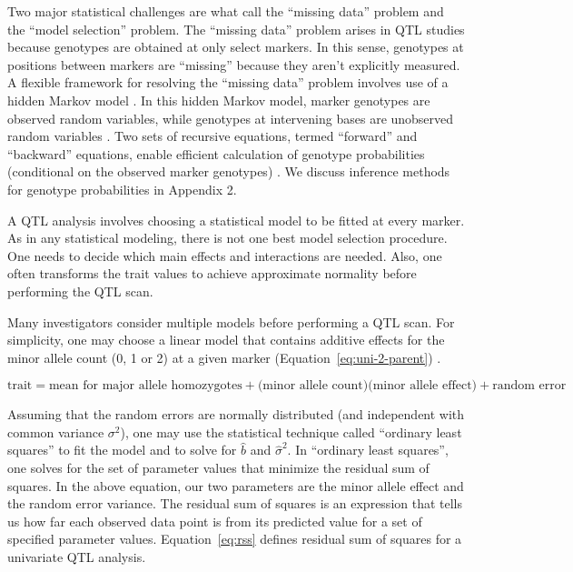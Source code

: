 \documentclass[oneside]{book}\usepackage[]{graphicx}\usepackage[]{color}
\begin{document}
Two major statistical challenges are what \citet{broman2009guide} call 
the ``missing data'' problem and the ``model selection'' problem. 
The ``missing data'' problem arises in QTL studies because genotypes are obtained
at only select markers. In this sense, genotypes at positions between
markers are ``missing'' because they aren't explicitly measured. 
A flexible framework for resolving the ``missing data'' problem involves use of a
hidden Markov model \citep{broman2009guide, broman2006use}. 
In this hidden Markov model, marker genotypes are observed random variables, 
while genotypes at intervening bases are unobserved random variables \citep{broman2009guide,broman2006use}. 
Two sets of recursive equations, termed ``forward'' and ``backward'' equations,
enable efficient calculation of genotype probabilities
(conditional on the observed marker genotypes) \citep{baum1970maximization}. We discuss inference methods for genotype probabilities in Appendix 2.




A QTL analysis involves choosing a statistical model to be fitted at every marker. 
As in any statistical modeling, there is not one best model selection procedure.
One needs to decide which main effects and interactions are needed.
Also, one often transforms the trait values to achieve approximate normality before performing the QTL scan. 

Many investigators consider multiple models before performing a QTL scan.
For simplicity, one may choose a linear model that contains additive effects for
the  minor allele count (0, 1 or 2) at a given marker (Equation~\ref{eq:uni-2-parent}) \citep{martinez1992estimating,haley1992simple}.

\begin{equation}
\text{trait} = \text{mean for major allele homozygotes} + \text{(minor allele count)}\text{(minor allele effect)} + \text{random error}
\label{eq:uni-2-parent}
\end{equation}

Assuming that the random errors are normally distributed (and independent with common
variance $\sigma^2$), one may use the statistical technique called ``ordinary least squares''
to fit the model and to solve for $\hat b$ and $\hat \sigma^2$.
In ``ordinary least squares'', one solves for the set of parameter values that
minimize the residual sum of squares. In the above equation, our two parameters are the minor allele effect and the random error variance. The residual sum of squares is an expression that tells us how far each observed data point is from its predicted value for a set of specified parameter values. Equation~\ref{eq:rss} defines residual sum of squares for a univariate QTL analysis.
\end{document}
